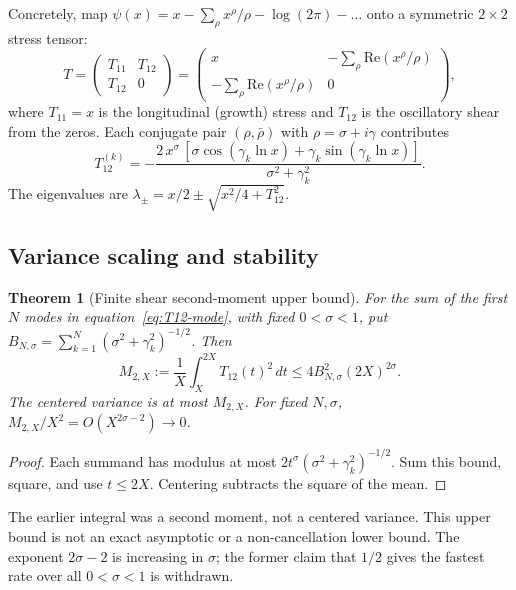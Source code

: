 \documentclass[11pt,a4paper]{article}
\theoremstyle{plain}
\newtheorem{theorem}{Theorem}[section]
\theoremstyle{definition}
\theoremstyle{remark}
\begin{document}
Concretely, map
$\psi(x) = x - \sum_\rho x^\rho/\rho - \log(2\pi) - \ldots$
onto a symmetric $2 \times 2$ stress tensor:
\begin{equation}\label{eq:stress-tensor}
  T = \begin{pmatrix} T_{11} & T_{12} \\ T_{12} & 0 \end{pmatrix}
    = \begin{pmatrix} x & -\sum_\rho \mathrm{Re}(x^\rho/\rho) \\
                      -\sum_\rho \mathrm{Re}(x^\rho/\rho) & 0 \end{pmatrix},
\end{equation}
where $T_{11} = x$ is the longitudinal (growth) stress and $T_{12}$ is
the oscillatory shear from the zeros.  Each conjugate pair
$(\rho, \bar{\rho})$ with $\rho = \sigma + i\gamma$ contributes
\begin{equation}\label{eq:T12-mode}
  T_{12}^{(k)} = -\frac{2\,x^\sigma\,[\sigma\cos(\gamma_k \ln x) + \gamma_k \sin(\gamma_k \ln x)]}{\sigma^2 + \gamma_k^2}.
\end{equation}
The eigenvalues are
$\lambda_\pm = x/2 \pm \sqrt{x^2/4 + T_{12}^2}$.

\subsection{Variance scaling and stability}

\begin{theorem}[Finite shear second-moment upper bound]\label{thm:variance}
For the sum of the first $N$ modes in equation~\eqref{eq:T12-mode}, with
fixed $0<\sigma<1$, put $B_{N,\sigma}=\sum_{k=1}^N
(\sigma^2+\gamma_k^2)^{-1/2}$. Then
\[
 M_{2,X}:=\frac1X\int_X^{2X}T_{12}(t)^2\,dt
 \le4 B_{N,\sigma}^2(2X)^{2\sigma}.
\]
The centered variance is at most $M_{2,X}$. For fixed $N,\sigma$,
$M_{2,X}/X^2=O(X^{2\sigma-2})\to0$.
\end{theorem}
\begin{proof}
Each summand has modulus at most $2t^\sigma
(\sigma^2+\gamma_k^2)^{-1/2}$. Sum this bound, square, and use
$t\le2X$. Centering subtracts the square of the mean.
\end{proof}
The earlier integral was a second moment, not a centered variance. This
upper bound is not an exact asymptotic or a non-cancellation lower bound.
The exponent $2\sigma-2$ is increasing in $\sigma$; the former claim that
$1/2$ gives the fastest rate over all $0<\sigma<1$ is withdrawn.
\end{document}
